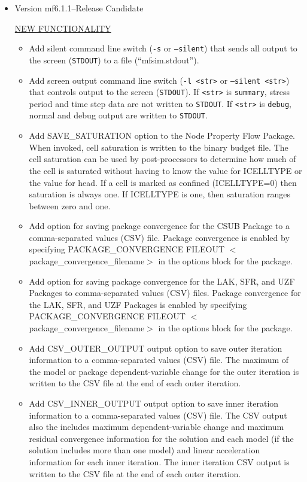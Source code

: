\documentclass[11pt,twoside,twocolumn]{usgsreport}
\begin{document}
\begin{itemize}
	\item Version mf6.1.1--Release Candidate

	\underline{NEW FUNCTIONALITY}
	\begin{itemize}
		\item Add silent command line switch (\texttt{-s} or \texttt{--silent}) that sends all output to the screen (\texttt{STDOUT})  to a file (``mfsim.stdout'').
		\item Add screen output command line switch (\texttt{-l <str>} or \texttt{--silent <str>}) that controls output to the screen (\texttt{STDOUT}). If \texttt{<str>}  is \texttt{summary}, stress period and time step data are not written to \texttt{STDOUT}. If \texttt{<str>} is \texttt{debug}, normal and debug output are written to \texttt{STDOUT}. 
		\item Add SAVE\_SATURATION option to the Node Property Flow Package.  When invoked, cell saturation is written to the binary budget file.  The cell saturation can be used by post-processors to determine how much of the cell is saturated without having to know the value for ICELLTYPE or the value for head. If a cell is marked as confined (ICELLTYPE=0) then saturation is always one. If ICELLTYPE is one, then saturation ranges between zero and one.
		\item Add option for saving package convergence for the CSUB Package to a comma-separated values (CSV) file. Package convergence is enabled by specifying PACKAGE\_CONVERGENCE FILEOUT $<$package\_convergence\_filename$>$ in the options block for the package.
		\item Add option for saving package convergence for the LAK, SFR, and UZF Packages to comma-separated values (CSV) files. Package convergence for the LAK, SFR, and UZF Packages is enabled by specifying PACKAGE\_CONVERGENCE FILEOUT $<$package\_convergence\_filename$>$ in the options block for the package.
		\item Add CSV\_OUTER\_OUTPUT output option to save outer iteration information to a comma-separated values (CSV) file. The maximum of the model or package dependent-variable change for the outer iteration is written to the CSV file at the end of each outer iteration. 
		\item Add CSV\_INNER\_OUTPUT output option to save inner iteration information to a comma-separated values (CSV) file. The CSV output also the includes maximum dependent-variable change and maximum residual convergence information for the solution and each model (if the solution includes more than one model) and linear acceleration information for each inner iteration. The inner iteration CSV output is written to the CSV file at the end of each outer iteration.

\end{itemize}
\end{itemize}
\end{document}
